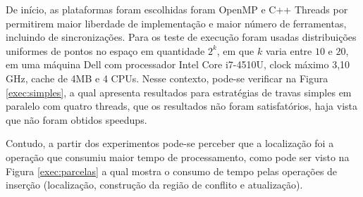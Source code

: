 \documentclass[a4paper, 12pt]{article}
\begin{document}
De início, as plataformas foram escolhidas foram OpenMP e C++ Threads por permitirem maior liberdade de implementação e maior número de
ferramentas, incluindo de sincronizações. Para os teste de execução foram usadas distribuições uniformes de pontos no espaço em quantidade $2^k$, 
em que $k$ varia entre $10$ e $20$, em uma máquina Dell com processador Intel Core i7-4510U, clock máximo 3,10 GHz, cache de 4MB e 4 CPUs.
Nesse contexto, pode-se verificar na Figura \ref{exec:simples}, a qual apresenta resultados para estratégias de travas simples em 
paralelo com quatro threads, que os resultados não foram satisfatórios, haja vista que não foram obtidos speedups. \\

\begin{center}
\label{exec:simples}
\end{center}

Contudo, a partir dos experimentos pode-se perceber que a localização foi a operação que consumiu maior tempo de processamento, como
pode ser visto na Figura \ref{exec:parcelas} a qual mostra o consumo de tempo pelas operações de inserção (localização, construção da região de
conflito e atualização).
\end{document}
